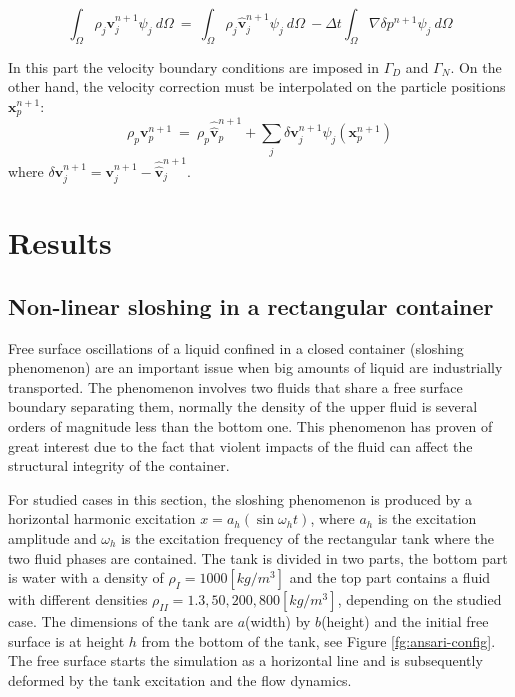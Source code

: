 \documentclass[a4paper,conference]{IEEEtran}
\begin{document}
\begin{enumerate}
 \begin{footnotesize}
 \begin{equation}\label{Step6a}
  \int_{\Omega} \rho_j \mathbf{v}_j^{n+1}\psi_j\ d\Omega \ = \ \int_{\Omega} \rho_j  \widehat{\mathbf{v}}_j^{n+1}\psi_j\ d\Omega\ - \Delta t \int_{\Omega}  \nabla \delta p^{n+1}\psi_j\ d\Omega
 \end{equation}
 \end{footnotesize}
 In this part the velocity boundary conditions are imposed in $\Gamma_D$ and $\Gamma_N$. On the other hand, the velocity correction must be interpolated on the particle positions $\mathbf{x}_{p}^{n+1}$:
  \begin{equation}\label{Step6b}
  \rho_p \mathbf{v}_p^{n+1}\  = \ \rho_p \widehat{\widehat{\mathbf{v}}}_p^{n+1} + \sum_{j} \delta \mathbf{v}_j^{n+1} \psi_j(\mathbf{x}_{p}^{n+1})
  \end{equation}
  where $\delta \mathbf{v}_j^{n+1} = \mathbf{v}_j^{n+1}-\widehat{\widehat{\mathbf{v}}}_j^{n+1}$.

\end{enumerate}




\section{Results}


\subsection{Non-linear sloshing in a rectangular container}%

Free surface oscillations of a liquid confined in a closed container (sloshing phenomenon) are an important issue when big amounts of liquid are industrially transported. The phenomenon involves two fluids that share a free surface boundary separating them, normally the density of the upper fluid is several orders of magnitude less than the bottom one. This phenomenon has proven of great interest due to the fact that violent impacts of the fluid can affect the structural integrity of the container.

For studied cases in this section, the sloshing phenomenon is produced by a horizontal harmonic excitation $x = a_h (\sin \omega_h t)$, where $a_h$ is the excitation amplitude and $\omega_h$ is the excitation frequency of the rectangular tank where the two fluid phases are contained. The tank is divided in two parts, the bottom part is water with a density of $\rho_{I} = 1000 [kg/m^3]$ and the top part contains a fluid with different densities $\rho_{II} = 1.3, 50, 200, 800 [kg/m^3]$, depending on the studied case. The dimensions of the tank are $a$(width) by $b$(height) and the initial free surface is at height $h$ from the bottom of the tank, see Figure \ref{fg:ansari-config}. The free surface starts the simulation as a horizontal line and is subsequently deformed by the tank excitation and the flow dynamics.
\end{document}
